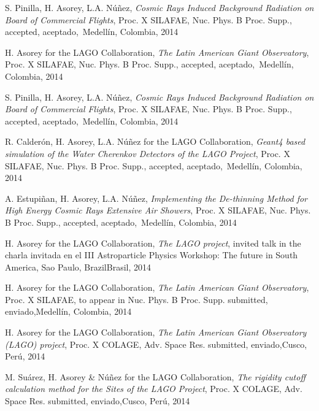 \begin{etaremune}
\item {}S. Pinilla, H. Asorey, L.A. Núñez, {\emph{Cosmic Rays Induced Background Radiation on Board of Commercial Flights}}, \en Proc. X SILAFAE, Nuc. Phys. B Proc. Supp., \ifeng accepted, \else aceptado,\fi\ Medellín, Colombia, 2014


\item {}H. Asorey for the LAGO Collaboration, {\emph{The Latin American Giant Observatory}}, \en Proc. X SILAFAE, Nuc. Phys. B Proc. Supp., \ifeng accepted, \else aceptado,\fi\ Medellín, Colombia, 2014

\item {}S. Pinilla, H. Asorey, L.A. Núñez, {\emph{Cosmic Rays Induced Background Radiation on Board of Commercial Flights}}, \en Proc. X SILAFAE, Nuc. Phys. B Proc. Supp., \ifeng accepted, \else aceptado,\fi\ Medellín, Colombia, 2014

\item {}R. Calderón, H. Asorey, L.A. Núñez for the LAGO Collaboration, {\emph{Geant4 based simulation of the Water Cherenkov Detectors of the LAGO Project}}, \en Proc. X SILAFAE, Nuc. Phys. B Proc. Supp., \ifeng accepted, \else aceptado,\fi\ Medellín, Colombia, 2014

\item {}A. Estupiñan, H. Asorey, L.A. Núñez, {\emph{Implementing the De-thinning Method for High Energy Cosmic Rays Extensive Air Showers}}, \en Proc. X SILAFAE, Nuc. Phys. B Proc. Supp., \ifeng accepted, \else aceptado,\fi\ Medellín, Colombia, 2014

\item {}H. Asorey for the LAGO Collaboration, {\emph{The LAGO project}}, \ifeng invited talk in the \else charla invitada en el \fi III Astroparticle Physics Workshop: The future in South America, Sao Paulo, \ifeng Brazil\else Brasil\fi, 2014
  
\item {}H. Asorey for the LAGO Collaboration, {\emph{The Latin American Giant Observatory}}, \en Proc. X SILAFAE, to appear in Nuc. Phys. B Proc. Supp. \ifeng submitted, \else enviado,\fi  Medellín, Colombia, 2014

\item {}H. Asorey for the LAGO Collaboration, {\emph{The Latin American Giant Observatory (LAGO) project}}, \en Proc. X COLAGE, Adv. Space Res. \ifeng submitted, \else enviado,\fi  Cusco, Perú, 2014

\item {}M. Suárez, H. Asorey \& Núñez for the LAGO Collaboration, {\emph{The rigidity cutoff calculation method for the Sites of the LAGO Project}}, \en Proc. X COLAGE, Adv. Space Res. \ifeng submitted, \else enviado,\fi  Cusco, Perú, 2014


\end{etaremune}
